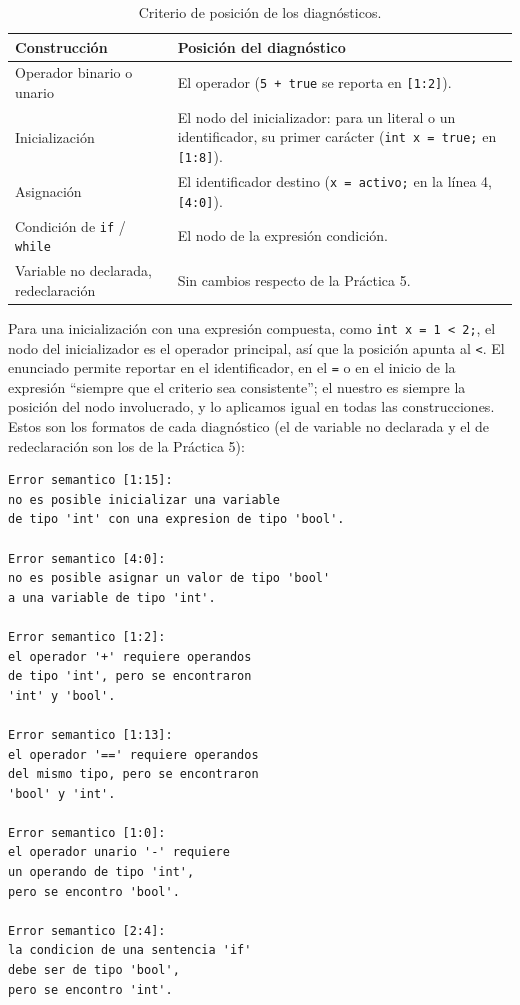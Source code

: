 \documentclass[12pt,letterpaper]{article}
\begin{document}
\begin{table}[H]
\centering
\small
\begin{tabular}{|p{4.6cm}|p{11cm}|}
\hline
\textbf{Construcción} & \textbf{Posición del diagnóstico} \\ \hline
Operador binario o unario & El operador (\texttt{5 + true} se reporta en \texttt{[1:2]}). \\ \hline
Inicialización & El nodo del inicializador: para un literal o un identificador, su primer carácter
  (\texttt{int x = true;} en \texttt{[1:8]}). \\ \hline
Asignación & El identificador destino (\texttt{x = activo;} en la línea 4, \texttt{[4:0]}). \\ \hline
Condición de \texttt{if} / \texttt{while} & El nodo de la expresión condición. \\ \hline
Variable no declarada, redeclaración & Sin cambios respecto de la Práctica 5. \\ \hline
\end{tabular}
\caption{Criterio de posición de los diagnósticos.}
\end{table}

Para una inicialización con una expresión compuesta, como \texttt{int x = 1 < 2;}, el nodo del inicializador es
el operador principal, así que la posición apunta al \texttt{<}. El enunciado permite reportar en el
identificador, en el \texttt{=} o en el inicio de la expresión ``siempre que el criterio sea consistente'';
el nuestro es siempre la posición del nodo involucrado, y lo aplicamos igual en todas las construcciones.\\

Estos son los formatos de cada diagnóstico (el de variable no declarada y el de redeclaración son los de la
Práctica 5):

\begin{verbatim}
Error semantico [1:15]:
no es posible inicializar una variable
de tipo 'int' con una expresion de tipo 'bool'.

Error semantico [4:0]:
no es posible asignar un valor de tipo 'bool'
a una variable de tipo 'int'.

Error semantico [1:2]:
el operador '+' requiere operandos
de tipo 'int', pero se encontraron
'int' y 'bool'.

Error semantico [1:13]:
el operador '==' requiere operandos
del mismo tipo, pero se encontraron
'bool' y 'int'.

Error semantico [1:0]:
el operador unario '-' requiere
un operando de tipo 'int',
pero se encontro 'bool'.

Error semantico [2:4]:
la condicion de una sentencia 'if'
debe ser de tipo 'bool',
pero se encontro 'int'.
\end{verbatim}
\end{document}
